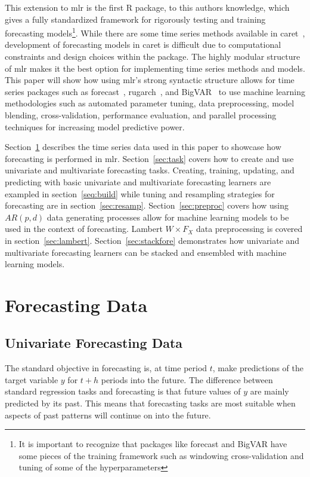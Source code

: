 \documentclass[12pt]{article}\usepackage[]{graphicx}\usepackage[]{color}
\theoremstyle{definition}
\let\proglang=\textsf
\newcommand{\pkg}[1]{{\fontseries{b}\selectfont #1}}
\begin{document}
This extension to \pkg{mlr} is the first \proglang{R} package, to this authors knowledge, which gives a fully standardized framework for rigorously testing and training forecasting models\footnote{It is important to recognize that packages like \pkg{forecast} and \pkg{BigVAR} have some pieces of the training framework such as windowing cross-validation and tuning of some of the hyperparameters}. While there are some time series methods available in \pkg{caret}~\cite{caret}, development of forecasting models in \pkg{caret} is difficult due to computational constraints and design choices within the package. The highly modular structure of \pkg{mlr} makes it the best option for implementing time series methods and models. This paper will show how using \pkg{mlr}'s strong syntactic structure allows for time series packages such as \pkg{forecast}~\cite{HyndForecast}, \pkg{rugarch}~\cite{rugarch}, and \pkg{BigVAR}~\cite{BigVAR} to use machine learning methodologies such as automated parameter tuning, data preprocessing, model blending, cross-validation, performance evaluation, and parallel processing techniques for increasing model predictive power.

Section~\ref{sec:m4data} describes the time series data used in this paper to showcase how forecasting is performed in \pkg{mlr}. Section~\ref{sec:task} covers how to create and use univariate and multivariate forecasting tasks. Creating, training, updating, and predicting with basic univariate and multivariate forecasting learners are exampled in section~\ref{seq:build} while tuning and resampling strategies for forecasting are in section~\ref{sec:resamp}. Section~\ref{sec:preproc} covers how using $AR(p,d)$ data generating processes allow for machine learning models to be used in the context of forecasting. Lambert $W\times F_X$ data preprocessing is covered in section~\ref{sec:lambert}. Section~\ref{sec:stackfore} demonstrates how univariate and multivariate forecasting learners can be stacked and ensembled with machine learning models.

\section{Forecasting Data}
\label{sec:m4data}

\subsection{Univariate Forecasting Data}
The standard objective in forecasting is, at time period $t$, make predictions of the target variable $y$ for $t+h$ periods into the future. The difference between standard regression tasks and forecasting is that future values of $y$ are mainly predicted by its past. This means that forecasting tasks are most suitable when aspects of past patterns will continue on into the future. 
\end{document}
